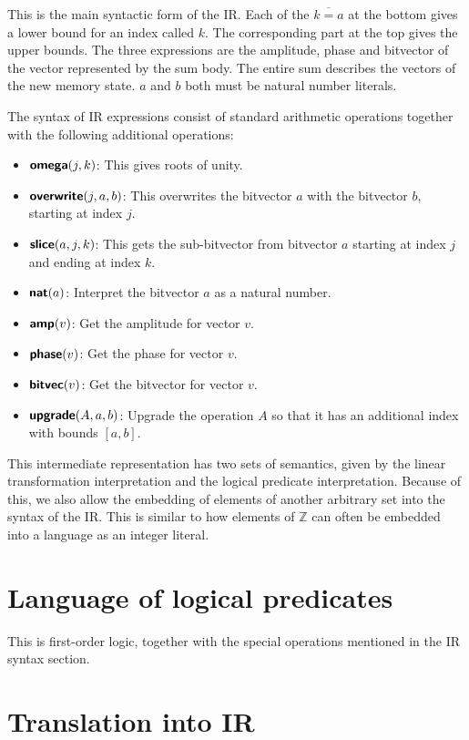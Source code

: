 \documentclass[runningheads]{llncs}
\newcommand {\ir} [1] {\textsf{\textbf{#1}}}
\newcommand {\irUpgrade} {\ir{upgrade}}
\newcommand {\irOverwrite} {\ir{overwrite}}
\newcommand {\irSlice} {\ir{slice}}
\newcommand {\irNat} {\ir{nat}}
\newcommand {\irAmp} {\ir{amp}}
\newcommand {\irPhase} {\ir{phase}}
\newcommand {\irBV} {\ir{bitvec}}
\newcommand {\irOmega} {\ir{omega}}
\begin{document}
This is the main syntactic form of the IR. Each of the $\overline{k=a}$ at the bottom gives a lower bound for an index called $k$. The corresponding part at the top gives the upper bounds.
The three expressions are the amplitude, phase and bitvector of the vector represented by the sum body. The entire sum describes the vectors of the new memory state. $a$ and $b$ both must be natural number literals.

The syntax of IR expressions consist of standard arithmetic operations together with the following additional operations:

\begin{itemize}
  \item $\irOmega(j, k)$: This gives roots of unity.
  \item $\irOverwrite(j, a, b)$: This overwrites the bitvector $a$ with the bitvector $b$, starting at index $j$.
  \item $\irSlice(a, j, k)$: This gets the sub-bitvector from bitvector $a$ starting at index $j$ and ending at index $k$.
  \item $\irNat(a)$: Interpret the bitvector $a$ as a natural number.
  \item $\irAmp(v)$: Get the amplitude for vector $v$.
  \item $\irPhase(v)$: Get the phase for vector $v$.
  \item $\irBV(v)$: Get the bitvector for vector $v$.
  \item $\irUpgrade(A, a, b)$: Upgrade the operation $A$ so that it has an additional index with bounds $[a,b]$.
\end{itemize}

This intermediate representation has two sets of semantics, given by the linear transformation interpretation and the logical predicate interpretation. Because of this, we also allow the embedding of elements of another arbitrary set into the syntax of the IR. This is similar to how elements of $\mathbb{Z}$ can often be embedded into a language as an integer literal.

\section{Language of logical predicates}

This is first-order logic, together with the special operations mentioned in the IR syntax section.

\section{Translation into IR}
\end{document}
